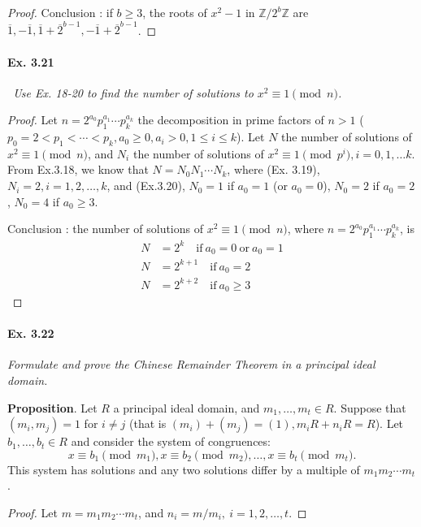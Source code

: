 \documentclass[11pt,a4paper]{article}
\newcommand{\Z}{\mathbb{Z}}
\begin{document}
{\begin{proof}
Conclusion : if $b\geq 3$, the roots of $x^2-1$ in $\Z/2^b\Z$ are $ \overline{1}, -\overline{1}, \overline{1} + \overline{2}^{b-1},-\overline{1} + \overline{2}^{b-1}$.
\end{proof}

\paragraph{Ex. 3.21}

{\it \
Use Ex. 18-20 to find the number of solutions to $x^2 \equiv 1 \pmod n$.
}

\begin{proof}
Let $n = 2^{a_0}p_1^{a_1}\cdots p_k^{a_k}$ the decomposition in prime factors of $n>1$ ($p_0=2<p_1<\cdots<p_k, a_0\geq 0, a_i>0, 1\leq i \leq k$). Let $N$ the number of solutions of $x^2 \equiv 1 \pmod n$, and $N_i$ the number of solutions of $x^2 \equiv 1 \pmod {p^i}, i = 0,1,\ldots k$. From Ex.3.18, we know that $N = N_0N_1\cdots N_k$, where (Ex. 3.19), $N_i = 2, i=1,2,\ldots,k$, and (Ex.3.20), $N_0=1$ if $a_0=1$ (or $a_0 = 0$), $N_0 = 2$ if $a_0 = 2$, $N_0=4$ if $a_0\geq 3$.

Conclusion : the number of solutions of $x^2 \equiv 1 \pmod n$,  where $n = 2^{a_0}p_1^{a_1}\cdots p_k^{a_k}$, is
\begin{align*}
N &= 2^k\quad \mathrm{if}\ a_0=0\ \mathrm{or}\ a_0 = 1\\
N &= 2^{k+1} \quad \mathrm{if}\ a_0=2\\
N &= 2^{k+2} \quad \mathrm{if}\ a_0\geq 3
\end{align*}
\end{proof}

\paragraph{Ex. 3.22}

{\it Formulate and prove the Chinese Remainder Theorem in a principal ideal domain.
}

{\bf Proposition}. Let $R$ a principal ideal domain, and $m_1,\ldots,m_t \in R$. Suppose that $(m_i,m_j) = 1$ for $i\neq j$ (that is $(m_i) + (m_j) = (1), m_iR +n_i R = R$). Let $b_1,\ldots,b_t \in R$ and consider the system of congruences:
$$x \equiv b_1 \pmod {m_1}, x \equiv b_2 \pmod {m_2},\ldots, x \equiv b_t \pmod {m_t}.$$
This system has solutions and any two solutions differ by a multiple of $m_1m_2\cdots m_t$.
\begin{proof} 
Let $m = m_1m_2\cdots m_t$, and $n_i =m/m_i,\ i=1,2,\ldots,t$. 


\end{proof}}
\end{document}
